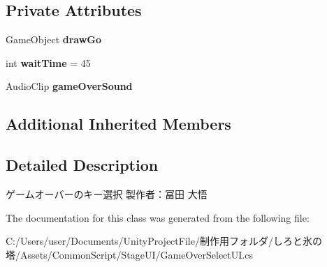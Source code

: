 \subsection*{Private Attributes}
\begin{DoxyCompactItemize}
\item 
\mbox{\label{class_game_over_select_u_i_a19c55cfa529044b87bc51af9f27a311d}} 
Game\+Object {\bfseries draw\+Go}
\item 
\mbox{\label{class_game_over_select_u_i_a68a56e3e6740f5549a393f97472f3cb0}} 
int {\bfseries wait\+Time} = 45
\item 
\mbox{\label{class_game_over_select_u_i_a16f9f27b6d7d42544246e51b35184034}} 
Audio\+Clip {\bfseries game\+Over\+Sound}
\end{DoxyCompactItemize}
\subsection*{Additional Inherited Members}


\subsection{Detailed Description}
ゲームオーバーのキー選択 製作者：冨田 大悟 



The documentation for this class was generated from the following file\+:\begin{DoxyCompactItemize}
\item 
C\+:/\+Users/user/\+Documents/\+Unity\+Project\+File/制作用フォルダ/しろと氷の塔/\+Assets/\+Common\+Script/\+Stage\+U\+I/Game\+Over\+Select\+U\+I.\+cs\end{DoxyCompactItemize}
